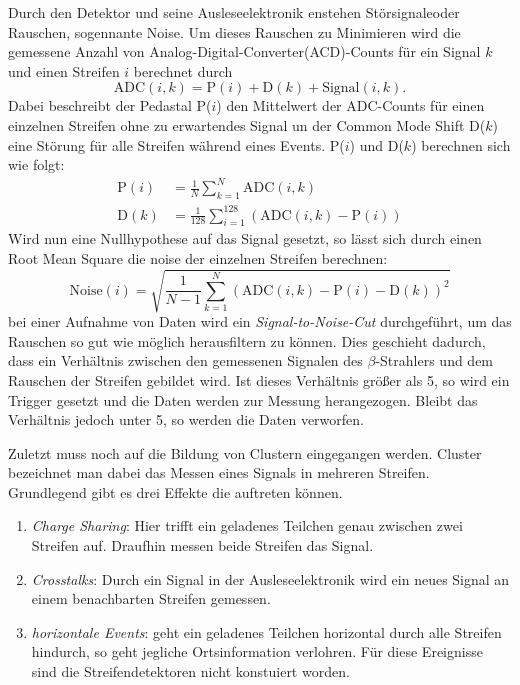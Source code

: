 Durch den Detektor und seine Ausleseelektronik enstehen Störsignaleoder Rauschen,
sogennante Noise. Um dieses Rauschen zu Minimieren wird die gemessene Anzahl von
Analog-Digital-Converter(ACD)-Counts für ein Signal $k$ und einen Streifen $i$
berechnet durch
\begin{equation}
  \text{ADC}(i, k) = \text{P}(i) + \text{D}(k) + \text{Signal}(i, k).
\end{equation}
Dabei beschreibt der Pedastal P($i$) den Mittelwert der ADC-Counts für einen
einzelnen Streifen ohne zu erwartendes Signal un der Common Mode Shift D($k$)
eine Störung für alle Streifen während eines Events. P($i$) und D($k$) berechnen
sich wie folgt:
\begin{align}
  \text{P}(i) &= \frac{1}{N} \sum_{k=1}^N \text{ADC}(i, k) \\
  \text{D}(k) &= \frac{1}{128} \sum_{i=1}^{128} \left(\text{ADC}(i, k) - \text{P}(i) \right)
\end{align}
Wird nun eine Nullhypothese auf das Signal gesetzt, so lässt sich durch einen
Root Mean Square die noise der einzelnen Streifen berechnen:
\begin{equation}
  \text{Noise}(i) = \sqrt{ \frac{1}{N-1} \sum_{k=1}^N \left(\text{ADC}(i,k) - \text{P} (i) - \text{D}(k)\right)^2 }
\end{equation}
bei einer Aufnahme von Daten wird ein \textit{Signal-to-Noise-Cut} durchgeführt,
um das Rauschen so gut wie möglich herausfiltern zu können. Dies geschieht
dadurch, dass ein Verhältnis zwischen den gemessenen Signalen des $\beta$-Strahlers
und dem Rauschen der Streifen gebildet wird. Ist dieses Verhältnis größer als 5,
so wird ein Trigger gesetzt und die Daten werden zur Messung herangezogen. Bleibt
das Verhältnis jedoch unter 5, so werden die Daten verworfen.

Zuletzt muss noch auf die Bildung von Clustern eingegangen werden. Cluster
bezeichnet man dabei das Messen eines Signals in mehreren Streifen. Grundlegend
gibt es drei Effekte die auftreten können.
\begin{enumerate}
  \item \textit{Charge Sharing}: Hier trifft ein geladenes Teilchen genau
  zwischen zwei Streifen auf. Draufhin messen beide Streifen das Signal.
  \item \textit{Crosstalks}: Durch ein Signal in der Ausleseelektronik wird ein
  neues Signal an einem benachbarten Streifen gemessen.
  \item \textit{horizontale Events}: geht ein geladenes Teilchen horizontal durch
  alle Streifen hindurch, so geht jegliche Ortsinformation verlohren. Für diese
  Ereignisse sind die Streifendetektoren nicht konstuiert worden.
\end{enumerate}
